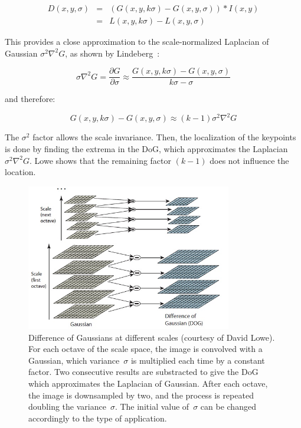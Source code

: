 \[
\begin{array}{rcl}
D(x,y,\sigma) & = & (G(x,y, k\sigma) - G(x,y,\sigma)) * I(x,y) \\
 & = & L(x,y,k\sigma) - L(x,y,\sigma)
\end{array}
\] 

This provides a close approximation to the scale-normalized Laplacian of Gaussian $\sigma^2\nabla^2G$, as shown by Lindeberg~\cite{Lindeberg_1994}:

\[ \sigma\nabla^2G = \frac{\partial G}{\partial \sigma} \approx \frac{G(x,y,k\sigma)-G(x,y,\sigma)}{k\sigma - \sigma} \]

and therefore:

\[ G(x,y,k\sigma) - G(x,y,\sigma) \approx (k-1)\sigma^2\nabla^2G \]

The $\sigma^2$ factor allows the scale invariance. Then, the localization of the keypoints is done by finding the extrema in the \gls{DoG}, which approximates the Laplacian~$\sigma^2\nabla^2G$. Lowe shows that the remaining factor $(k-1)$ does not influence the location. 

\begin{figure}[h]
\centering
\includegraphics[width=0.8\textwidth]{figures/sift_dog}
\caption{Difference of Gaussians at different scales (courtesy of David Lowe). For each octave of the scale space, the image is convolved with a Gaussian, which variance~$\sigma$ is multiplied each time by a constant factor. Two consecutive results are substracted to give the DoG which approximates the Laplacian of Gaussian. After each octave, the image is downsampled by two, and the process is repeated doubling the variance~$\sigma$. The initial value of~$\sigma$ can be changed accordingly to the type of application. }
\label{fig:sift_dog}
\end{figure}

